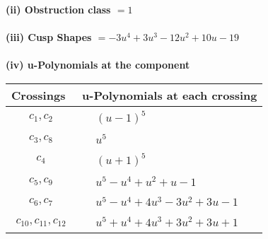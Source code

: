 \documentclass[1p]{elsarticle_modified}
\theoremstyle{definition}
\begin{document}
\flushleft \textbf{(ii) Obstruction class $= 1$}\\~\\
\flushleft \textbf{(iii) Cusp Shapes $= -3 u^4+3 u^3-12 u^2+10 u-19$}\\~\\
\newpage\renewcommand{\arraystretch}{1}
\flushleft \textbf{(iv) u-Polynomials at the component}\newline \\
\begin{tabular}{m{50pt}|m{274pt}}
Crossings & \hspace{64pt}u-Polynomials at each crossing \\
\hline $$\begin{aligned}c_{1},c_{2}\end{aligned}$$&$\begin{aligned}
&(u-1)^5
\end{aligned}$\\
\hline $$\begin{aligned}c_{3},c_{8}\end{aligned}$$&$\begin{aligned}
&u^5
\end{aligned}$\\
\hline $$\begin{aligned}c_{4}\end{aligned}$$&$\begin{aligned}
&(u+1)^5
\end{aligned}$\\
\hline $$\begin{aligned}c_{5},c_{9}\end{aligned}$$&$\begin{aligned}
&u^5- u^4+u^2+u-1
\end{aligned}$\\
\hline $$\begin{aligned}c_{6},c_{7}\end{aligned}$$&$\begin{aligned}
&u^5- u^4+4 u^3-3 u^2+3 u-1
\end{aligned}$\\
\hline $$\begin{aligned}c_{10},c_{11},c_{12}\end{aligned}$$&$\begin{aligned}
&u^5+u^4+4 u^3+3 u^2+3 u+1
\end{aligned}$\\
\hline
\end{tabular}\\~\\
\end{document}
